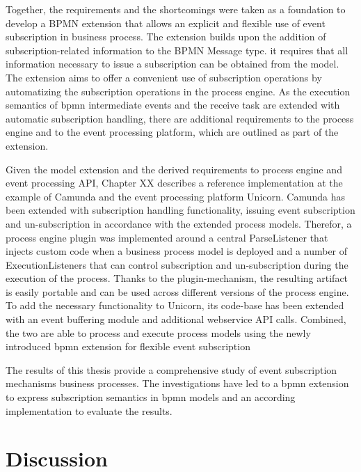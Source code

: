 Together, the requirements and the shortcomings were taken as a foundation to develop a BPMN extension that allows an explicit and flexible use of event subscription in business process.
The extension builds upon the addition of subscription-related information to the BPMN Message type. it requires that all information necessary to issue a subscription can be obtained from the model.
The extension aims to offer a convenient use of subscription operations by automatizing the subscription operations in the process engine.
As the execution semantics of bpmn intermediate events and the receive task are extended with automatic subscription handling, there are additional requirements to the process engine and to the event processing platform, which are outlined as part of the extension.

Given the model extension and the derived requirements to process engine and event processing API, Chapter XX describes a reference implementation at the example of Camunda and the event processing platform Unicorn.
Camunda has been extended with subscription handling functionality, issuing event subscription and un-subscription in accordance with the extended process models.
Therefor, a process engine plugin was implemented around a central ParseListener that injects custom code when a business process model is deployed and a number of ExecutionListeners that can control subscription and un-subscription during the execution of the process.
Thanks to the plugin-mechanism, the resulting artifact is easily portable and can be used across different versions of the process engine.
To add the necessary functionality to Unicorn, its code-base has been extended with an event buffering module and additional webservice API calls.
Combined, the two are able to process and execute process models using the newly introduced bpmn extension for flexible event subscription

The results of this thesis provide a comprehensive study of event subscription mechanisms business processes. 
The investigations have led to a bpmn extension to express subscription semantics in bpmn models and an according implementation to evaluate the results.



\section{Discussion}

